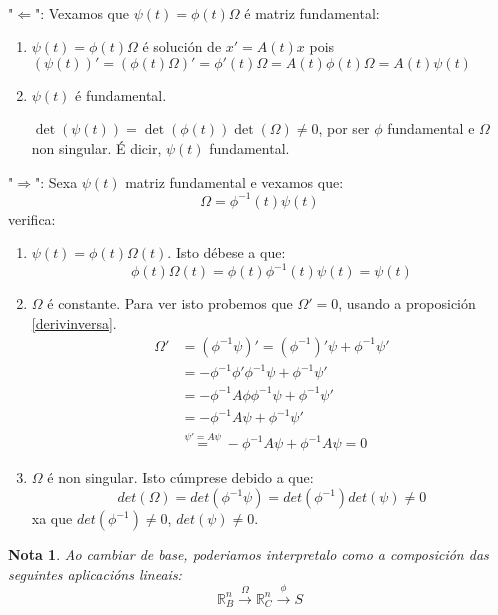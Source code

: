 \documentclass[11pt, a4paper,twoside]{article}
\makeatletter
\theoremstyle{theorem-style}  %
\renewenvironment{proof}[1][\proofname]{\par
	\pushQED{\qed}%
	\normalfont \topsep6\p@\@plus6\p@\relax
	\list{}{%
		\settowidth{\leftmargin}{\quad:\hskip\labelsep}%
		\setlength{\labelwidth}{0pt}%
		\setlength{\itemindent}{-\leftmargin}%
	}%
	\item[\hskip\labelsep\itshape#1\@addpunct{:}]\ignorespaces
}{%
	\popQED\endlist\@endpefalse
}
\theoremstyle{definition-style}
\newtheorem*{note}{Nota} %
\theoremstyle{example-style}
\makeatother
\begin{document}
\begin{proof}\ \\
	"$ \Leftarrow $": Vexamos que $ \psi(t)=\phi(t)\varOmega $ é matriz fundamental:
	\begin{enumerate}[\quad i)]
		\item $ \psi(t)=\phi(t)\varOmega $ é solución de $ x'=A(t)x $ pois $ (\psi(t))'=(\phi(t)\varOmega)'=\phi'(t)\varOmega=A(t)\phi(t)\varOmega =A(t)\psi(t) $
		\item $ \psi(t) $ é fundamental.
		
		$ \det (\psi(t))=\det(\phi(t))\det(\varOmega)\neq 0 $, por ser $ \phi $ fundamental e $ \varOmega $ non singular. É dicir, $ \psi(t) $ fundamental.
	\end{enumerate}
	"$ \Rightarrow$": Sexa $\psi (t)$ matriz fundamental e vexamos que:
	\[\varOmega = \phi^{-1} (t) \psi(t)\]
	verifica:
	\begin{enumerate}
		\item  $\psi(t) = \phi(t) \varOmega(t)$. Isto débese a que:
		\[\phi(t) \varOmega (t) = \phi(t) \phi^{-1}(t) \psi(t) = \psi(t) \]
		\item  $\varOmega$ é constante. Para ver isto probemos que $\varOmega' = 0$, usando a proposición \ref{derivinversa}.
		\begin{align*}
			\varOmega' &= (\phi^{-1} \psi)' = (\phi^{-1})'\psi + \phi^{-1}\psi' \\ 
			&= -\phi^{-1} \phi' \phi^{-1} \psi + \phi^{-1}\psi'\\
			&= -\phi^{-1} A \phi \phi^{-1} \psi + \phi^{-1} \psi'\\
			&= -\phi^{-1} A \psi + \phi^{-1} \psi' \\
			&\stackrel{\psi' = A \psi}{=} -\phi^{-1} A \psi + \phi^{-1} A \psi = 0
		\end{align*}
		\item  $\varOmega$ é non singular. Isto cúmprese debido a que:
		\[det(\varOmega) = det(\phi^{-1} \psi) = det(\phi^{-1}) det(\psi) \neq 0\]
		xa que $det(\phi^{-1}) \neq 0$, $det(\psi) \neq 0$.
	\end{enumerate}
\end{proof}
\begin{note}
	Ao cambiar de base, poderiamos interpretalo como a composición das seguintes aplicacións lineais:
	\[\mathbb{R}^n_{B}\xrightarrow{\varOmega} \mathbb{R}^n_{C} \xrightarrow{\phi}S \]
\end{note}
\end{document}
